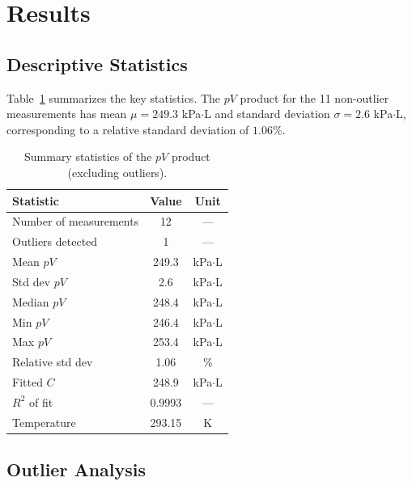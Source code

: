 \documentclass{article}
\theoremstyle{plain}
\theoremstyle{definition}
\theoremstyle{remark}
\begin{document}
\section{Results}

\subsection{Descriptive Statistics}

Table~\ref{tab:results} summarizes the key statistics. The $pV$ product for
the 11 non-outlier measurements has mean $\mu = 249.3$ kPa$\cdot$L and standard
deviation $\sigma = 2.6$ kPa$\cdot$L, corresponding to a relative standard
deviation of $1.06\%$.

\begin{table}[t]
  \caption{Summary statistics of the $pV$ product (excluding outliers).}
  \label{tab:results}
  \begin{center}
    \begin{small}
      \begin{sc}
        \begin{tabular}{lcc}
          \toprule
          Statistic & Value & Unit \\
          \midrule
          Number of measurements & 12 & --- \\
          Outliers detected & 1 & --- \\
          Mean $pV$ & 249.3 & kPa$\cdot$L \\
          Std dev $pV$ & 2.6 & kPa$\cdot$L \\
          Median $pV$ & 248.4 & kPa$\cdot$L \\
          Min $pV$ & 246.4 & kPa$\cdot$L \\
          Max $pV$ & 253.4 & kPa$\cdot$L \\
          Relative std dev & 1.06 & \% \\
          Fitted $C$ & 248.9 & kPa$\cdot$L \\
          $R^2$ of fit & 0.9993 & --- \\
          Temperature & 293.15 & K \\
          \bottomrule
        \end{tabular}
      \end{sc}
    \end{small}
  \end{center}
  \vskip -0.1in
\end{table}

\subsection{Outlier Analysis}
\end{document}
